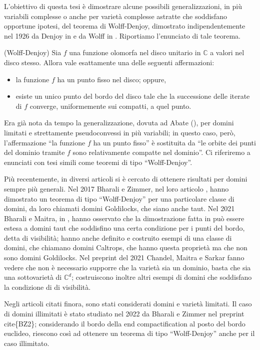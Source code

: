 L'obiettivo di questa tesi è dimostrare alcune possibili generalizzazioni, in più variabili complesse o anche per varietà complesse astratte che soddisfano opportune ipotesi, del teorema di Wolff-Denjoy, dimostrato indipendentemente nel 1926 da Denjoy in \cite{D} e da Wolff in \cite{Wo}. Riportiamo l'enunciato di tale teorema.

\begin{thm}
    (Wolff-Denjoy) Sia $f$ una funzione olomorfa nel disco unitario in $\mathbb{C}$ a valori nel disco stesso. Allora vale esattamente una delle seguenti affermazioni:
    \begin{itemize}
        \item la funzione $f$ ha un punto fisso nel disco; oppure,
        \item esiste un unico punto del bordo del disco tale che la successione delle iterate di $f$ converge, uniformemente sui compatti, a quel punto.
    \end{itemize}
\end{thm}

Era già nota da tempo la generalizzazione, dovuta ad Abate (\cite[Theorem 0.5]{A2}), per domini limitati e strettamente pseudoconvessi in più variabili; in questo caso, però, l'affermazione ``la funzione $f$ ha un punto fisso'' è sostituita da ``le orbite dei punti del dominio tramite $f$ sono relativamente compatte nel dominio''. Ci riferiremo a enunciati con tesi simili come teoremi di tipo ``Wolff-Denjoy''.

Più recentemente, in diversi articoli si è cercato di ottenere risultati per domini sempre più generali. Nel 2017 Bharali e Zimmer, nel loro articolo \cite{BZ1}, hanno dimostrato un teorema di tipo ``Wolff-Denjoy'' per una particolare classe di domini, da loro chiamati domini Goldilocks, che siano anche taut. Nel 2021 Bharali e Maitra, in \cite{BM}, hanno osservato che la dimostrazione fatta in \cite{BZ1} può essere estesa a domini taut che soddisfino una certa condizione per i punti del bordo, detta di visibilità; hanno anche definito e costruito esempi di una classe di domini, che chiamano domini Caltrops, che hanno questa proprietà ma che non sono domini Goldilocks. Nel preprint \cite{CMS} del 2021 Chandel, Maitra e Sarkar fanno vedere che non è necessario supporre che la varietà sia un dominio, basta che sia una sottovarietà di $\mathbb{C}^d$; costruiscono inoltre altri esempi di domini che soddisfano la condizione di di visibilità.

Negli articoli citati finora, sono stati considerati domini e varietà limitati. Il caso di domini illimitati è stato studiato nel 2022 da Bharali e Zimmer nel preprint cite\{BZ2\}; considerando il bordo della end compactification al posto del bordo euclideo, riescono così ad ottenere un teorema di tipo ``Wolff-Denjoy'' anche per il caso illimitato.

